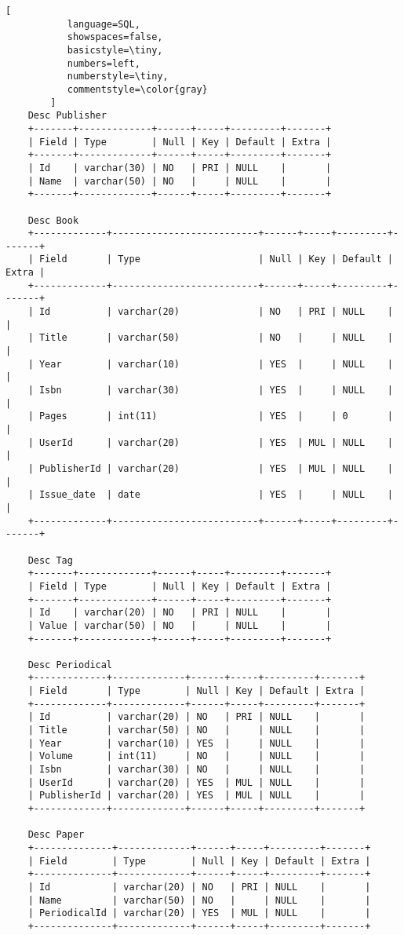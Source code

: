\documentclass[12pt]{article}
\begin{document}
\begin{lstlisting}[
           language=SQL,
           showspaces=false,
           basicstyle=\tiny,
           numbers=left,
           numberstyle=\tiny,
           commentstyle=\color{gray}
        ]
	Desc Publisher
	+-------+-------------+------+-----+---------+-------+
	| Field | Type        | Null | Key | Default | Extra |
	+-------+-------------+------+-----+---------+-------+
	| Id    | varchar(30) | NO   | PRI | NULL    |       |
	| Name  | varchar(50) | NO   |     | NULL    |       |
	+-------+-------------+------+-----+---------+-------+

	Desc Book
	+-------------+--------------------------+------+-----+---------+-------+
	| Field       | Type                     | Null | Key | Default | Extra |
	+-------------+--------------------------+------+-----+---------+-------+
	| Id          | varchar(20)              | NO   | PRI | NULL    |       |
	| Title       | varchar(50)              | NO   |     | NULL    |       |
	| Year        | varchar(10)              | YES  |     | NULL    |       |
	| Isbn        | varchar(30)              | YES  |     | NULL    |       |
	| Pages       | int(11)                  | YES  |     | 0       |       |
	| UserId      | varchar(20)              | YES  | MUL | NULL    |       |
	| PublisherId | varchar(20)              | YES  | MUL | NULL    |       |
	| Issue_date  | date                     | YES  |     | NULL    |       |
	+-------------+--------------------------+------+-----+---------+-------+
	
	Desc Tag
	+-------+-------------+------+-----+---------+-------+
	| Field | Type        | Null | Key | Default | Extra |
	+-------+-------------+------+-----+---------+-------+
	| Id    | varchar(20) | NO   | PRI | NULL    |       |
	| Value | varchar(50) | NO   |     | NULL    |       |
	+-------+-------------+------+-----+---------+-------+

	Desc Periodical
	+-------------+-------------+------+-----+---------+-------+
	| Field       | Type        | Null | Key | Default | Extra |
	+-------------+-------------+------+-----+---------+-------+
	| Id          | varchar(20) | NO   | PRI | NULL    |       |
	| Title       | varchar(50) | NO   |     | NULL    |       |
	| Year        | varchar(10) | YES  |     | NULL    |       |
	| Volume      | int(11)     | NO   |     | NULL    |       |
	| Isbn        | varchar(30) | NO   |     | NULL    |       |
	| UserId      | varchar(20) | YES  | MUL | NULL    |       |
	| PublisherId | varchar(20) | YES  | MUL | NULL    |       |
	+-------------+-------------+------+-----+---------+-------+

	Desc Paper
	+--------------+-------------+------+-----+---------+-------+
	| Field        | Type        | Null | Key | Default | Extra |
	+--------------+-------------+------+-----+---------+-------+
	| Id           | varchar(20) | NO   | PRI | NULL    |       |
	| Name         | varchar(50) | NO   |     | NULL    |       |
	| PeriodicalId | varchar(20) | YES  | MUL | NULL    |       |
	+--------------+-------------+------+-----+---------+-------+


\end{lstlisting}
\end{document}
